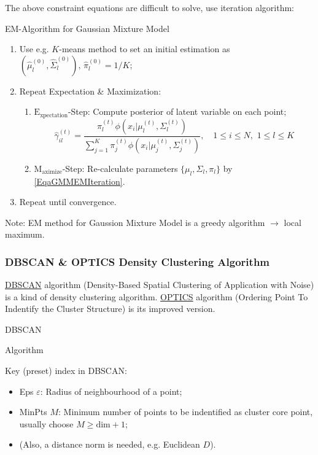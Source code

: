     The above constraint equations are difficult to solve, use iteration algorithm:
\begin{algorithm}{EM-Algorithm for Gaussian Mixture Model}
    \begin{enumerate}[topsep=2pt,itemsep=2pt]
        \item Use e.g. $ K $-means method to set an initial estimation as $ (\hat{\mu}^{(0)}_l,\hat{\Sigma }_l^{(0)}),\,\hat{\pi}_l^{(0)}=1/K$;
        \item Repeat Expectation \& Maximization:
        \begin{enumerate}[topsep=2pt,itemsep=2pt]
            \item $ \mathrm{E_{xpectation}} $-Step: Compute posterior of latent variable on each point;
        \begin{equation}
            \hat{\gamma }_{il}^{(t)}=\dfrac{\pi_l^{(t)}\phi(x_i|\mu _l^{(t)},\Sigma _l^{(t)})}{\sum\limits_{j=1}^K\pi_j^{(t)}\phi (x_i|\mu _j^{(t)},\Sigma _j^{(t)})} ,\quad  1\leq i\leq N,\,\, 1\leq l\leq K
        \end{equation}
        \item $ \mathrm{M_{aximize}} $-Step: Re-calculate parameters $ \{\mu_l,\Sigma _l,\pi_l\} $ by \autoref{EqaGMMEMIteration}.
        \end{enumerate}
        \item Repeat until convergence.
    \end{enumerate}
\end{algorithm}
    
    Note: EM method for Gaussion Mixture Model is a greedy algorithm $ \longrightarrow $ local maximum.
    
\subsubsection{DBSCAN \& OPTICS Density Clustering Algorithm}
    \hyperlink{DBSCAN}{DBSCAN} algorithm (Density-Based Spatial Clustering of Application with Noise) is a kind of density clustering algorithm. \hyperlink{OPTICS}{OPTICS} algorithm (Ordering Point To Indentify the Cluster Structure) is its improved version.


\begin{point}
    \hypertarget{DBSCAN}{DBSCAN} Algorithm
\end{point}
    Key (preset) index in DBSCAN:
    \begin{itemize}[topsep=2pt,itemsep=2pt]
        \item Eps $ \varepsilon  $: Radius of neighbourhood of a point;
        \item MinPts $ M $: Minimum number of points to be indentified as cluster core point, usually choose $ M\geq \mathrm{dim}+1 $;
        \item (Also, a distance norm is needed, e.g. Euclidean $ D $).
    \end{itemize}
    
